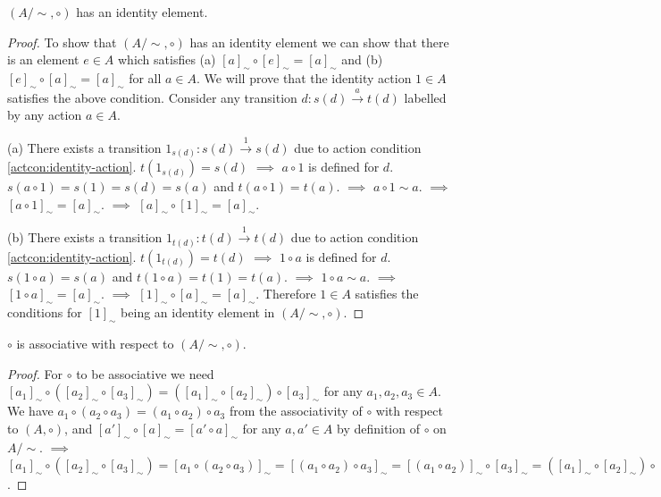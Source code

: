 \begin{proposition}\label{prp:Asim-identity}
    $(A/\sim, \circ)$ has an identity element.
\end{proposition}
\begin{proof}
    To show that $(A/\sim, \circ)$ has an identity element we can show that there is an element $e \in A$ which satisfies (a) $[a]_{\sim} \circ [e]_{\sim} = [a]_{\sim}$ and (b) $[e]_{\sim} \circ [a]_{\sim} = [a]_{\sim}$ for all $a \in A$.
    We will prove that the identity action $1 \in A$ satisfies the above condition.
    Consider any transition $d: s(d) \xrightarrow{a} t(d)$ labelled by any action $a \in A$.
    
    (a) There exists a transition $1_{s(d)}: s(d) \xrightarrow{1} s(d)$ due to action condition \ref{actcon:identity-action}.
    $t(1_{s(d)})=s(d)$ $\implies$ $a \circ 1$ is defined for $d$.
    $s(a \circ 1) = s(1) = s(d) = s(a)$ and $t(a \circ 1) = t(a)$.
    $\implies$ $a \circ 1 \sim a$.
    $\implies$ $[a \circ 1]_{\sim} = [a]_{\sim}$.
    $\implies$ $[a]_{\sim} \circ [1]_{\sim} = [a]_{\sim}$.
    
    (b) There exists a transition $1_{t(d)}: t(d) \xrightarrow{1} t(d)$ due to action condition \ref{actcon:identity-action}.
    $t(1_{t(d)})=t(d)$ $\implies$ $1 \circ a$ is defined for $d$.
    $s(1 \circ a)=s(a)$ and $t(1 \circ a) = t(1) = t(a)$.
    $\implies$ $1 \circ a \sim a$.
    $\implies$ $[1 \circ a]_{\sim} = [a]_{\sim}$.
    $\implies$ $[1]_{\sim} \circ [a]_{\sim} = [a]_{\sim}$.
    Therefore $1 \in A$ satisfies the conditions for $[1]_{\sim}$ being an identity element in $(A/\sim, \circ)$.
\end{proof}

\begin{proposition}\label{prp:Asim-associative}
    $\circ$ is associative with respect to $(A/\sim, \circ)$.
\end{proposition}
\begin{proof}
    For $\circ$ to be associative we need $[a_{1}]_{\sim} \circ ([a_{2}]_{\sim} \circ [a_{3}]_{\sim}) = ([a_{1}]_{\sim} \circ [a_{2}]_{\sim}) \circ [a_{3}]_{\sim}$ for any $a_{1},a_{2},a_{3} \in A$.
    We have $a_{1} \circ (a_{2} \circ a_{3}) = (a_{1} \circ a_{2}) \circ a_{3}$ from the associativity of $\circ$ with respect to $(A, \circ)$, and $[a']_{\sim} \circ [a]_{\sim} = [a' \circ a]_{\sim}$ for any $a,a' \in A$ by definition of $\circ$ on $A/\sim$.
    $\implies$ $[a_{1}]_{\sim} \circ ([a_{2}]_{\sim} \circ [a_{3}]_{\sim}) = [a_{1} \circ (a_{2} \circ a_{3})]_{\sim} = [(a_{1} \circ a_{2}) \circ a_{3}]_{\sim} = [(a_{1} \circ a_{2})]_{\sim} \circ [a_{3}]_{\sim} = ([a_{1}]_{\sim} \circ [a_{2}]_{\sim}) \circ [a_{3}]_{\sim}$.
\end{proof}


